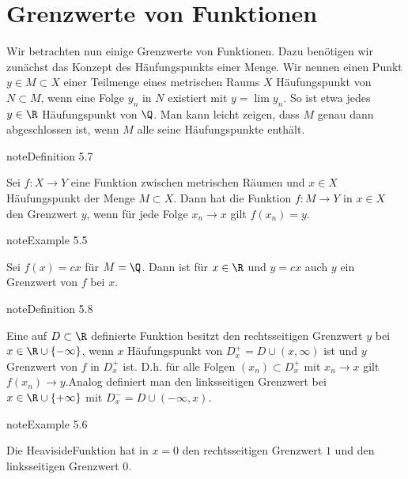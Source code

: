 \documentclass[letterpaper,10pt,english]{jupyterBook}
\begin{document}
\section{Grenzwerte von Funktionen}
\label{\detokenize{stetigkeit/grenzwerte:grenzwerte-von-funktionen}}\label{\detokenize{stetigkeit/grenzwerte::doc}}
Wir betrachten nun einige Grenzwerte von Funktionen. Dazu benötigen wir zunächst das Konzept des Häufungspunkts einer Menge. Wir nennen einen Punkt  \(y \in M \subset X\) einer Teilmenge eines metrischen Raums \(X\) Häufungspunkt von \(N \subset M\), wenn eine Folge \(y_n\) in \(N\) existiert mit \(y= \lim y_n\). So ist etwa jedes \(y \in \R\) Häufungspunkt von \(\Q\). Man kann leicht zeigen, dass \(M\) genau dann abgeschlossen ist, wenn \(M\) alle seine Häufungspunkte enthält.
\label{stetigkeit/grenzwerte:definition-0}
\begin{sphinxadmonition}{note}{Definition 5.7}



Sei \(f: X \rightarrow Y\) eine Funktion zwischen metrischen Räumen und \(x \in X\) Häufungspunkt der Menge \(M \subset X\). Dann hat die Funktion \(f: M \rightarrow Y\) in \(x \in X\) den Grenzwert \(y\), wenn für jede Folge \(x_n \rightarrow x\) gilt \(f(x_n) = y\).
\end{sphinxadmonition}
\label{stetigkeit/grenzwerte:example-1}
\begin{sphinxadmonition}{note}{Example 5.5}



Sei \(f(x) =cx\) für \(M = \Q\). Dann ist für \(x \in \R\) und \(y=cx\) auch \(y\) ein Grenzwert von \(f\) bei \(x\).
\end{sphinxadmonition}
\label{stetigkeit/grenzwerte:definition-2}
\begin{sphinxadmonition}{note}{Definition 5.8}



Eine auf \(D \subset \R\) definierte Funktion besitzt den rechtsseitigen Grenzwert \(y\) bei \(x \in \R \cup \{-\infty\}\), wenn \(x\)  Häufungspunkt von \(D_x^+=D \cup (x,\infty)\) ist und \(y\) Grenzwert von \(f\) in \(D_x^+\) ist. D.h. für alle Folgen \((x_n) \subset D_x^+\) mit \(x_n \rightarrow x\) gilt \(f(x_n) \rightarrow y\).Analog definiert man den linksseitigen Grenzwert bei \(x \in \R \cup \{+\infty\}\) mit \(D_x^-=D \cup (-\infty,x)\).
\end{sphinxadmonition}
\label{stetigkeit/grenzwerte:example-3}
\begin{sphinxadmonition}{note}{Example 5.6}



Die Heaviside\sphinxhyphen{}Funktion hat in \(x=0\) den rechtsseitigen Grenzwert \(1\) und den linksseitigen Grenzwert \(0\).
\end{sphinxadmonition}
\end{document}

